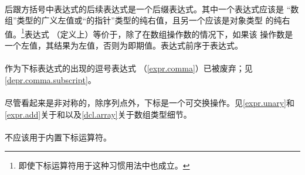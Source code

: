 \paragraph{} %
后跟方括号中表达式的后续表达式是一个后缀表达式。其中一个表达式应该是
“数组”类型的广义左值或“的指针”类型的纯右值，且另一个应该是对象类型
的纯右值。\footnote{即使下标运算符用于这种习惯用法中也成立。}表达式
（定义上）等价于，除了在数组操作数的情况下，如果该
操作数是一个左值，其结果为左值，否则为即期值。表达式前序于表达式。

\paragraph{} %
\begin{note}
  作为下标表达式的出现的逗号表达式
  （\ref{expr.comma}）已被废弃；见\ref{depr.comma.subscript}。
\end{note}

\paragraph{} %
\begin{note}
  尽管看起来是非对称的，除序列点外，下标是一个可交换操作。见\ref{expr.unary}和
  \ref{expr.add}关于\tm{*}和\tm{+}以及\ref{dcl.array}关于数组类型细节。
\end{note}

\paragraph{} %
不应该用于内置下标运算符。
